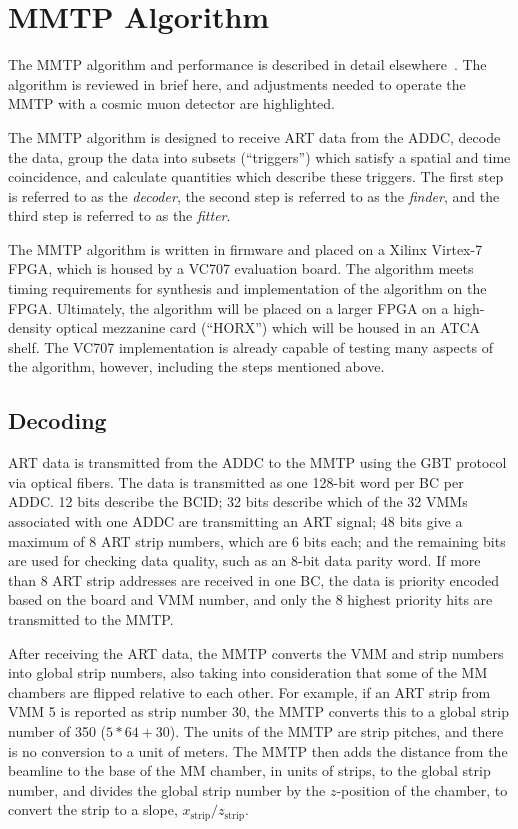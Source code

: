 \section{MMTP Algorithm}
\label{sec:alg}

The MMTP algorithm and performance is described in detail elsewhere~\cite{brian,steve}. The algorithm is reviewed in brief here, and adjustments needed to operate the MMTP with a cosmic muon detector are highlighted.

The MMTP algorithm is designed to receive ART data from the ADDC, decode the data, group the data into subsets (``triggers'') which satisfy a spatial and time coincidence, and calculate quantities which describe these triggers. The first step is referred to as the \textit{decoder}, the second step is referred to as the \textit{finder}, and the third step is referred to as the \textit{fitter}.

The MMTP algorithm is written in firmware and placed on a Xilinx Virtex-7 FPGA, which is housed by a VC707 evaluation board. The algorithm meets timing requirements for synthesis and implementation of the algorithm on the FPGA. Ultimately, the algorithm will be placed on a larger FPGA on a high-density optical mezzanine card (``HORX'') which will be housed in an ATCA shelf. The VC707 implementation is already capable of testing many aspects of the algorithm, however, including the steps mentioned above.

\subsection{Decoding}
\label{sec:alg-decode}

ART data is transmitted from the ADDC to the MMTP using the GBT protocol via optical fibers. The data is transmitted as one 128-bit word per BC per ADDC. 12 bits describe the BCID; 32 bits describe which of the 32 VMMs associated with one ADDC are transmitting an ART signal; 48 bits give a maximum of 8 ART strip numbers, which are 6 bits each; and the remaining bits are used for checking data quality, such as an 8-bit data parity word. If more than 8 ART strip addresses are received in one BC, the data is priority encoded based on the board and VMM number, and only the 8 highest priority hits are transmitted to the MMTP.

After receiving the ART data, the MMTP converts the VMM and strip numbers into global strip numbers, also taking into consideration that some of the MM chambers are flipped relative to each other. For example, if an ART strip from VMM 5 is reported as strip number 30, the MMTP converts this to a global strip number of 350 ($5*64 + 30$). The units of the MMTP are strip pitches, and there is no conversion to a unit of meters. The MMTP then adds the distance from the beamline to the base of the MM chamber, in units of strips, to the global strip number, and divides the global strip number by the $z$-position of the chamber, to convert the strip to a slope, $x_\text{strip} / z_\text{strip}$.

